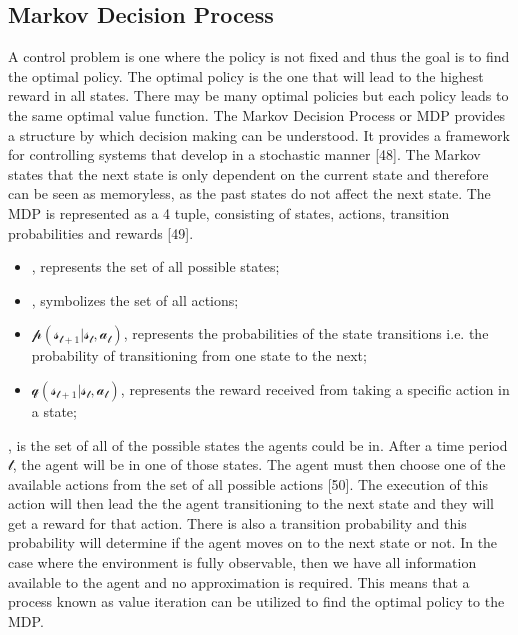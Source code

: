 \documentclass[oneside,12pt]{Classes/RoboticsLaTeX}
\begin{document}
\subsection{Markov Decision Process}
A control problem is one where the policy is not fixed and thus the goal is to find the optimal policy. The optimal policy is the one that will lead to the highest reward in all states. There may be many optimal policies but each policy leads to the same optimal value function. The Markov Decision Process or MDP provides a structure by which decision making can be understood. It provides a framework for controlling systems that develop in a stochastic manner [48]. The Markov states that the next state is only dependent on the current state and therefore can be seen as memoryless, as the past states do not affect the next state. The MDP is represented as a 4 tuple, consisting of states, actions, transition probabilities and rewards [49]. 
  
\begin{itemize}

    \item {}, represents the set of all possible states;
    \item {}, symbolizes the set of all actions;
    \item $\mathscr{p(s_{t+1}|s_t,a_t)}$, represents the probabilities of the state transitions i.e. the probability of transitioning from one state to the next;
    \item $\mathscr{q(s_{t+1}|s_t,a_t)}$, represents the reward received from taking a specific action in a state;
\end{itemize}

, is the set of all of the possible states the agents could be in. After a time period $\mathscr{t}$, the agent will be in one of those states. The agent must then choose one of the available actions from the set of all possible actions  [50]. The execution of this action will then lead the the agent transitioning to the next state and they will get a reward for that action. There is also a transition probability and this probability will determine if the agent moves on to the next state or not. In the case where the environment is fully observable, then we have all information available to the agent and no approximation is required. This means that a process known as value iteration can be utilized to find the optimal policy to the MDP.  
\end{document}
